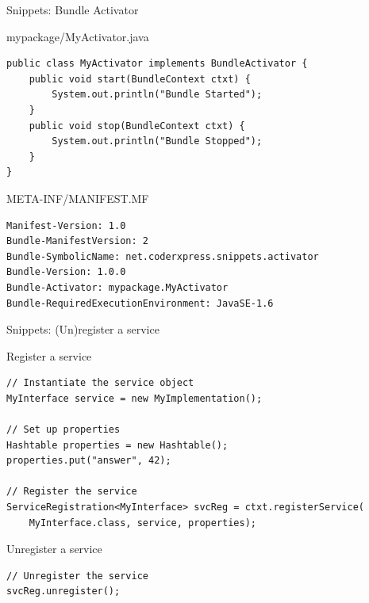 \begin{frame}[fragile]{Snippets: Bundle Activator}
\begin{small}
\begin{block}{mypackage/MyActivator.java}
\begin{verbatim}
public class MyActivator implements BundleActivator {
	public void start(BundleContext ctxt) {
		System.out.println("Bundle Started");
	}
	public void stop(BundleContext ctxt) {
		System.out.println("Bundle Stopped");
	}
}
\end{verbatim}
\vspace{-.8em}
\end{block}
\begin{block}{META-INF/MANIFEST.MF}
\begin{verbatim}
Manifest-Version: 1.0
Bundle-ManifestVersion: 2
Bundle-SymbolicName: net.coderxpress.snippets.activator
Bundle-Version: 1.0.0
Bundle-Activator: mypackage.MyActivator
Bundle-RequiredExecutionEnvironment: JavaSE-1.6
\end{verbatim}
\vspace{-.8em}
\end{block}
\end{small}
\end{frame}


\begin{frame}[fragile]{Snippets: (Un)register a service}
\begin{small}
\begin{block}{Register a service}
\begin{verbatim}
// Instantiate the service object
MyInterface service = new MyImplementation();

// Set up properties
Hashtable properties = new Hashtable();
properties.put("answer", 42);

// Register the service
ServiceRegistration<MyInterface> svcReg = ctxt.registerService(
	MyInterface.class, service, properties);
\end{verbatim}
\vspace{-.8em}
\end{block}

\begin{block}{Unregister a service}
\begin{verbatim}
// Unregister the service
svcReg.unregister();
\end{verbatim}
\vspace{-.8em}
\end{block}
\end{small}
\end{frame}

